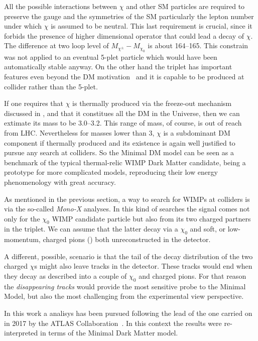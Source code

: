 All the possible interactions between $\chi$ and other SM particles are required to preserve the gauge and the symmetries of the SM particularly the lepton number under which $\chi$ is assumed to be neutral. This last requirement is crucial, since it forbids the presence of higher dimensional operator that could lead a decay of $\chi$.  The difference at two loop level of $M_{\chi^\pm} - M_{\chi_0}$ is  about \SIrange{164}{165}{\mev}. This constrain was not applied to an eventual 5-plet particle which would have been automatically stable anyway. On the other hand the triplet has important features even beyond the DM motivation~\cite{Cirelli:paper} and it is capable to be produced at collider rather than the 5-plet.

If one requires that $\chi$ is thermally produced via the freeze-out mechanism discussed in \Sect{\ref{sec:wimp}}, and that it constitues all the DM in the Universe, then we can extimate its mass to be \SIrange{3.0}{3.2}{\tev}. This range of mass, of course, is out of reach from LHC. Nevertheless for masses lower than \SI{3}{\tev}, $\chi$ is a subdominant DM component if thermally produced and its existence is again well justified to pursue any search at colliders. So the Minimal DM model can be seen as a benchmark of the typical thermal-relic WIMP Dark Matter candidate, being a prototype for more complicated models, reproducing their low energy phenomenology with great accuracy.

As mentioned in the previous section, a way to search for WIMPs at colliders is via the so-called \emph{Mono-X} analyses. In this kind of searches the signal comes not only for the $\chi_0$ WIMP candidate particle but also from its two charged partners in the triplet. We can assume that the latter decay via a $\chi_0$ and soft, or low-momentum, charged pions (\pipm) both unreconstructed in the detector. 

A different, possible, scenario is that the tail of the decay distribution of the two charged $\chi$s might also leave tracks in the detector. These tracks would end when they decay as described into a couple of $\chi_0$ and charged pions. For that reason the \emph{disappearing tracks} would provide the most sensitive probe to the Minimal Model, but also the most challenging from the experimental view perspective.

\smallskip
In this work a \mph analisys has been pursued following the lead of the one carried on in 2017 by the ATLAS Collaboration~\cite{paperMP}. In this context the \mph results were re-interpreted in terms of the Minimal Dark Matter model.










